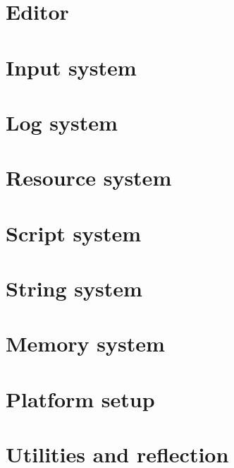 \documentclass[a4paper, 12pt]{report}
\begin{document}


\chapter{Editor}



\chapter{Input system}



\chapter{Log system}



\chapter{Resource system}



\chapter{Script system}



\chapter{String system}
\label{chap:string}



\chapter{Memory system}



\chapter{Platform setup}



\chapter{Utilities and reflection}
\label{chap:utils}
\end{document}
